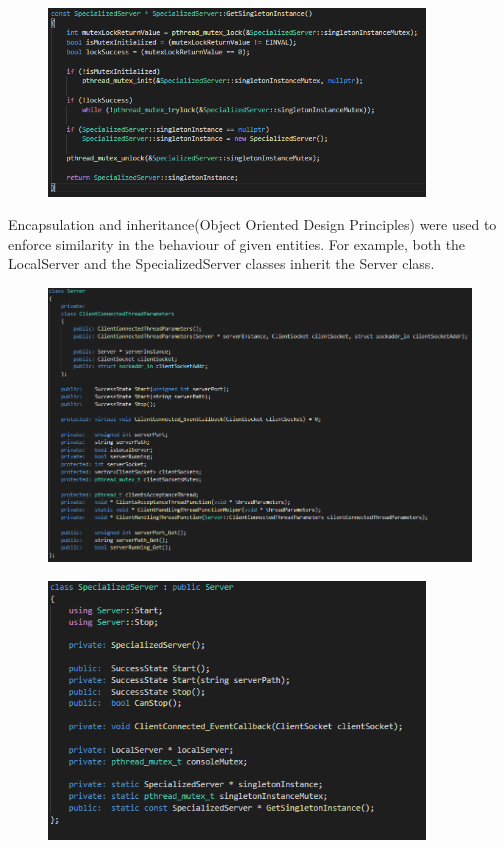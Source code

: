 \documentclass[runningheads]{llncs}
\begin{document}
\begin{figure}[H]
\centering
\includegraphics[width=100mm]{Singleton_Class_Design_Pattern.png}
\end{figure}
Encapsulation and inheritance(Object Oriented Design Principles) were used to enforce similarity in the behaviour of given entities. For example, both the LocalServer and the SpecializedServer classes inherit the Server class.\\
\begin{figure}[H]
\centering
\includegraphics[width=150mm]{Server.png}
\end{figure}
\begin{figure}[H]
\centering
\includegraphics[width=100mm]{SpecializedServer.png}
\end{figure}
\end{document}
